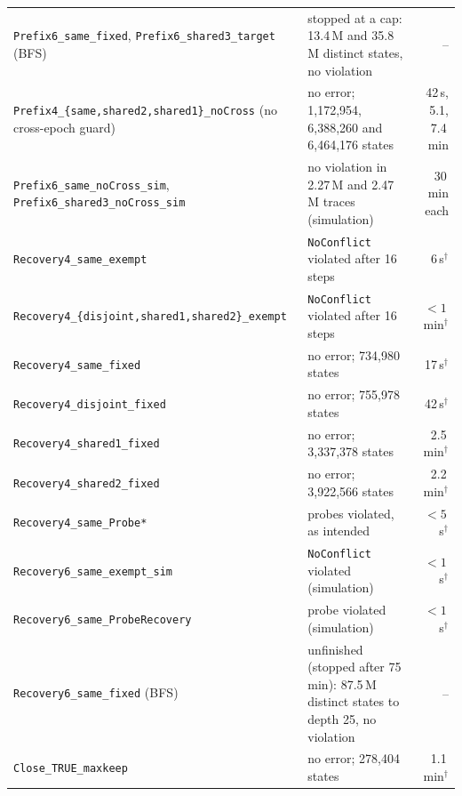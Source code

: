 \documentclass[conference]{IEEEtran}
\begin{document}
\begin{table}[t]
\begin{tabularx}{\textwidth}{@{}>{\raggedright\arraybackslash}p{}Yr@{}}
\texttt{Prefix6\_\allowbreak{}same\_\allowbreak{}fixed},\allowbreak{} \texttt{Prefix6\_\allowbreak{}shared3\_\allowbreak{}target} (BFS) & stopped at a cap: 13.4\,M and 35.8\,M distinct states, no violation & --\\
\texttt{Prefix4\_\allowbreak{}\{same,\allowbreak{}shared2,\allowbreak{}shared1\}\_\allowbreak{}noCross} (no cross-epoch guard) & no error; 1,172,954, 6,388,260 and 6,464,176 states & 42\,s, 5.1, 7.4\,min\\
\texttt{Prefix6\_\allowbreak{}same\_\allowbreak{}noCross\_\allowbreak{}sim},\allowbreak{} \texttt{Prefix6\_\allowbreak{}shared3\_\allowbreak{}noCross\_\allowbreak{}sim} & no violation in 2.27\,M and 2.47\,M traces (simulation) & 30\,min each\\
\midrule
\texttt{Recovery4\_\allowbreak{}same\_\allowbreak{}exempt} & \texttt{NoConflict} violated after 16 steps & 6\,s$^\dagger$\\
\texttt{Recovery4\_\allowbreak{}\{disjoint,\allowbreak{}shared1,\allowbreak{}shared2\}\_\allowbreak{}exempt} & \texttt{NoConflict} violated after 16 steps & $<1$\,min$^\dagger$\\
\texttt{Recovery4\_\allowbreak{}same\_\allowbreak{}fixed} & no error; 734,980 states & 17\,s$^\dagger$\\
\texttt{Recovery4\_\allowbreak{}disjoint\_\allowbreak{}fixed} & no error; 755,978 states & 42\,s$^\dagger$\\
\texttt{Recovery4\_\allowbreak{}shared1\_\allowbreak{}fixed} & no error; 3,337,378 states & 2.5\,min$^\dagger$\\
\texttt{Recovery4\_\allowbreak{}shared2\_\allowbreak{}fixed} & no error; 3,922,566 states & 2.2\,min$^\dagger$\\
\texttt{Recovery4\_\allowbreak{}same\_\allowbreak{}Probe*} & probes violated, as intended & $<5$\,s$^\dagger$\\
\texttt{Recovery6\_\allowbreak{}same\_\allowbreak{}exempt\_\allowbreak{}sim} & \texttt{NoConflict} violated (simulation) & $<1$\,s$^\dagger$\\
\texttt{Recovery6\_\allowbreak{}same\_\allowbreak{}ProbeRecovery} & probe violated (simulation) & $<1$\,s$^\dagger$\\
\texttt{Recovery6\_\allowbreak{}same\_\allowbreak{}fixed} (BFS) & unfinished (stopped after 75\,min): 87.5\,M distinct states to depth 25, no violation & --\\
\midrule
\texttt{Close\_\allowbreak{}TRUE\_\allowbreak{}maxkeep} & no error; 278,404 states & 1.1\,min$^\dagger$\\

\end{tabularx}
\end{table}
\end{document}
